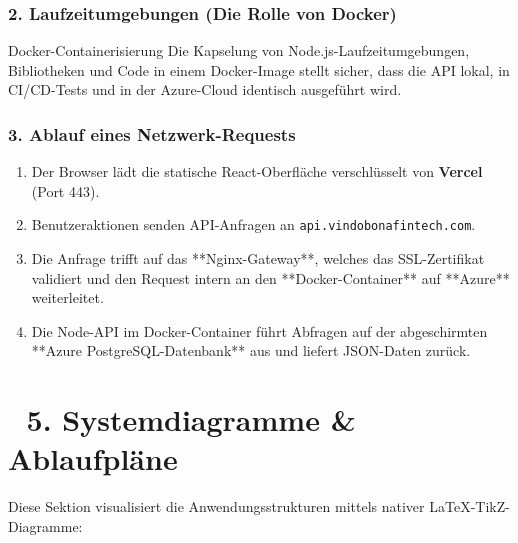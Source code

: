 \documentclass[11pt,a4paper]{article}
\begin{document}
\subsubsection{2. Laufzeitumgebungen (Die Rolle von Docker)}
\begin{ReasonBox}{Docker-Containerisierung}
Die Kapselung von Node.js-Laufzeitumgebungen, Bibliotheken und Code in einem Docker-Image stellt sicher, dass die API lokal, in CI/CD-Tests und in der Azure-Cloud identisch ausgeführt wird.
\end{ReasonBox}

\subsubsection{3. Ablauf eines Netzwerk-Requests}
\begin{enumerate}
    \item Der Browser lädt die statische React-Oberfläche verschlüsselt von \textbf{Vercel} (Port 443).
    \item Benutzeraktionen senden API-Anfragen an \texttt{api.vindobonafintech.com}.
    \item Die Anfrage trifft auf das **Nginx-Gateway**, welches das SSL-Zertifikat validiert und den Request intern an den **Docker-Container** auf **Azure** weiterleitet.
    \item Die Node-API im Docker-Container führt Abfragen auf der abgeschirmten **Azure PostgreSQL-Datenbank** aus und liefert JSON-Daten zurück.
\end{enumerate}

\newpage

\section{🎨 5. Systemdiagramme \& Ablaufpläne}
Diese Sektion visualisiert die Anwendungsstrukturen mittels nativer LaTeX-TikZ-Diagramme:
\end{document}
